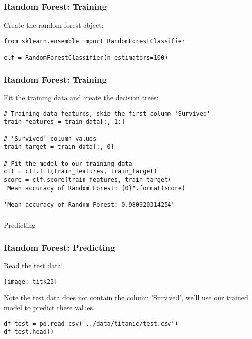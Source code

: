 \begin{frame}[fragile]\frametitle{Random Forest: Training}
Create the random forest object:
\begin{lstlisting}
from sklearn.ensemble import RandomForestClassifier

clf = RandomForestClassifier(n_estimators=100)
\end{lstlisting}
\end{frame}

\begin{frame}[fragile]\frametitle{Random Forest: Training}
Fit the training data and create the decision trees:
\begin{lstlisting}
# Training data features, skip the first column 'Survived'
train_features = train_data[:, 1:]

# 'Survived' column values
train_target = train_data[:, 0]

# Fit the model to our training data
clf = clf.fit(train_features, train_target)
score = clf.score(train_features, train_target)
"Mean accuracy of Random Forest: {0}".format(score)

'Mean accuracy of Random Forest: 0.980920314254'
\end{lstlisting}
\end{frame}

\begin{frame}[fragile]\frametitle{}
\begin{center}
{\Large Predicting}
\end{center}
\end{frame}


\begin{frame}[fragile]\frametitle{Random Forest: Predicting}
Read the test data:

\begin{center}
\texttt{[image: titk23]}
\end{center}

Note the test data does not contain the column 'Survived', we'll use our trained model to predict these values.

\begin{lstlisting}
df_test = pd.read_csv('../data/titanic/test.csv')
df_test.head()
\end{lstlisting}

\end{frame}


